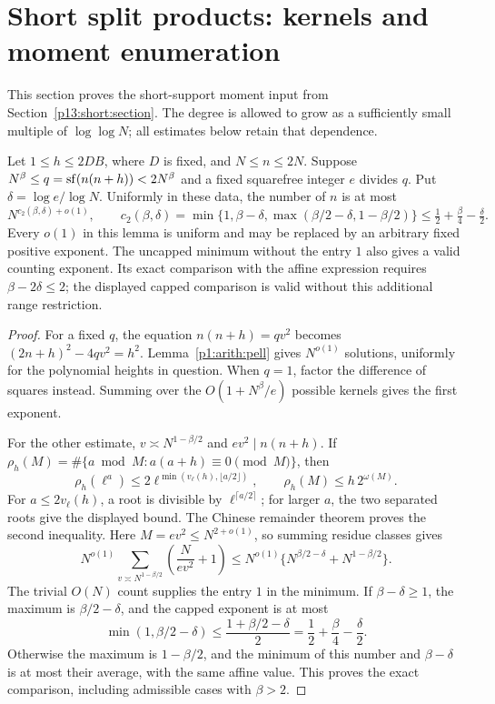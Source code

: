 \section{Short split products: kernels and moment enumeration}
\label{p14:comp:short}

This section proves the short-support moment input from
Section~\ref{p13:short:section}.  The degree is allowed to grow as a
sufficiently small multiple of $\log\log N$; all estimates below
retain that dependence.

\begin{lemma}
\label{p13:short:quadratic}
Let \(1\le h\le2DB\), where \(D\) is fixed, and \(N\le n\le2N\).
Suppose \(N^\beta\le q=\sf(n(n+h))<2N^\beta\) and a fixed squarefree
integer \(e\) divides \(q\). Put \(\delta=\log e/\log N\).
Uniformly in these data, the number of \(n\) is at most
\[
 N^{c_2(\beta,\delta)+o(1)},\qquad
 c_2(\beta,\delta)=
 \min\{1,\beta-\delta,\max(\beta/2-\delta,1-\beta/2)\}
 \le \tfrac12+\tfrac\beta4-\tfrac\delta2.
\]
Every \(o(1)\) in this lemma is uniform and may be replaced
by an arbitrary fixed positive exponent.
The uncapped minimum without the entry \(1\) also gives a valid
counting exponent.  Its exact comparison with the affine expression
requires \(\beta-2\delta\le2\); the displayed capped comparison is
valid without this additional range restriction.
\end{lemma}

\begin{proof}
For a fixed \(q\), the equation \(n(n+h)=qv^2\) becomes
\((2n+h)^2-4qv^2=h^2\). Lemma~\ref{p1:arith:pell}
gives \(N^{o(1)}\) solutions, uniformly for the polynomial
heights in question. When \(q=1\), factor the difference of
squares instead. Summing over the \(O(1+N^\beta/e)\)
possible kernels gives the first exponent.

For the other estimate, \(v\asymp N^{1-\beta/2}\) and
\(ev^2\mid n(n+h)\). If
\(\rho_h(M)=\#\{a\bmod M:a(a+h)\equiv0\pmod M\}\), then
\[
 \rho_h(\ell^a)
 \le2\ell^{\min(v_\ell(h),\lfloor a/2\rfloor)},\qquad
 \rho_h(M)\le h\,2^{\omega(M)}.
\]
For \(a\le2v_\ell(h)\), a root is divisible by
\(\ell^{\lceil a/2\rceil}\); for larger \(a\), the two
separated roots give the displayed bound. The Chinese
remainder theorem proves the second inequality. Here
\(M=ev^2\le N^{2+o(1)}\), so summing residue classes gives
\[
 N^{o(1)}
 \sum_{v\asymp N^{1-\beta/2}}\left(\frac{N}{ev^2}+1\right)
 \le N^{o(1)}
       \{N^{\beta/2-\delta}+N^{1-\beta/2}\}.
\]
The trivial \(O(N)\) count supplies the entry \(1\) in the
minimum.  If \(\beta-\delta\ge1\), the maximum is
\(\beta/2-\delta\), and the capped exponent is at most
\[
 \min(1,\beta/2-\delta)
 \le \frac{1+\beta/2-\delta}{2}
 =\frac12+\frac\beta4-\frac\delta2.
\]
Otherwise the maximum is \(1-\beta/2\), and the minimum of this
number and \(\beta-\delta\) is at most their average, with the
same affine value.  This proves the exact comparison, including
admissible cases with \(\beta>2\).
\end{proof}

